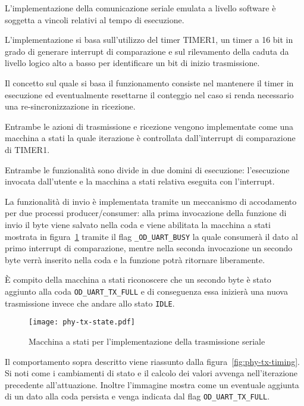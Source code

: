 L'implementazione della comunicazione seriale emulata a livello software è soggetta a vincoli relativi al tempo di esecuzione.

L'implementazione si basa sull'utilizzo del timer TIMER1, un timer a 16 bit in grado di generare interrupt di comparazione e sul rilevamento della caduta da livello logico alto a basso per identificare un bit di inizio trasmissione.

Il concetto sul quale si basa il funzionamento consiste nel mantenere il timer in esecuzione ed eventualmente resettarne il conteggio nel caso si renda necessario una re-sincronizzazione in ricezione.

Entrambe le azioni di trasmissione e ricezione vengono implementate come una macchina a stati la quale iterazione è controllata dall'interrupt di comparazione di TIMER1.

Entrambe le funzionalità sono divide in due domini di esecuzione: l'esecuzione invocata dall'utente e la macchina a stati relativa eseguita con l'interrupt. 

La funzionalità di invio è implementata tramite un meccanismo di accodamento per due processi producer/consumer: alla prima invocazione della funzione di invio il byte viene salvato nella coda e viene abilitata la macchina a stati mostrata in figura~\ref{fig:phy-state-tx} tramite il flag \texttt{\_OD\_UART\_BUSY} la quale consumerà il dato al primo interrupt di comparazione, mentre nella seconda invocazione un secondo byte verrà inserito nella coda e la funzione potrà ritornare liberamente. 

È compito della macchina a stati riconoscere che un secondo byte è stato aggiunto alla coda \texttt{OD\_UART\_TX\_FULL} e di conseguenza essa inizierà una nuova trasmissione invece che andare allo stato \texttt{IDLE}.

\begin{figure}[t]
    \centering
    \texttt{[image: phy-tx-state.pdf]}
    \caption[]{Macchina a stati per l'implementazione della trasmissione seriale}\label{fig:phy-state-tx}
\end{figure}

Il comportamento sopra descritto viene riassunto dalla figura~\ref{fig:phy-tx-timing}. Si noti come i cambiamenti di stato e il calcolo dei valori avvenga nell'iterazione precedente all'attuazione.
Inoltre l'immagine mostra come un eventuale aggiunta di un dato alla coda persista e venga indicata dal flag \texttt{OD\_UART\_TX\_FULL}.

